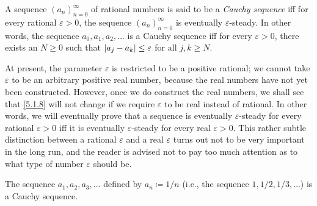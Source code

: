 \setcounter{thm}{7}
\begin{defn}\label{5.1.8}
  A sequence \((a_n)_{n = 0}^{\infty}\) of rational numbers is said to be a \emph{Cauchy sequence} iff for every rational \(\varepsilon > 0\), the sequence \((a_n)_{n = 0}^{\infty}\) is eventually \(\varepsilon\)-steady.
  In other words, the sequence \(a_0, a_1, a_2, \dots\) is a Cauchy sequence iff for every \(\varepsilon > 0\), there exists an \(N \geq 0\) such that \(\left\lvert a_j - a_k\right\rvert \leq \varepsilon\) for all \(j, k \geq N\).
\end{defn}

\begin{rmk}\label{5.1.9}
  At present, the parameter \(\varepsilon\) is restricted to be a positive rational;
  we cannot take \(\varepsilon\) to be an arbitrary positive real number, because the real numbers have not yet been constructed.
  However, once we do construct the real numbers, we shall see that \cref{5.1.8} will not change if we require \(\varepsilon\) to be real instead of rational.
  In other words, we will eventually prove that a sequence is eventually \(\varepsilon\)-steady for every rational \(\varepsilon > 0\) iff it is eventually \(\varepsilon\)-steady for every real \(\varepsilon > 0\).
  This rather subtle distinction between a rational \(\varepsilon\) and a real \(\varepsilon\) turns out not to be very important in the long run, and the reader is advised not to pay too much attention as to what type of number \(\varepsilon\) should be.
\end{rmk}

\setcounter{thm}{10}
\begin{prop}\label{5.1.11}
  The sequence \(a_1, a_2, a_3, \dots\) defined by \(a_n \coloneqq 1 / n\) (i.e., the sequence \(1, 1 / 2, 1 / 3, \dots\)) is a Cauchy sequence.
\end{prop}

